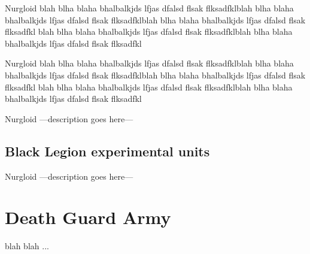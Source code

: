 \documentclass[a4paper, twocolumn]{article}
\begin{document}
\unit{Nurgloid} {							%
blah blha blaha bhalbalkjds lfjas dfalsd flsak flksadfklblah blha blaha bhalbalkjds lfjas dfalsd flsak flksadfklblah blha blaha bhalbalkjds lfjas dfalsd flsak flksadfkl
blah blha blaha bhalbalkjds lfjas dfalsd flsak flksadfklblah blha blaha bhalbalkjds lfjas dfalsd flsak flksadfkl
}
\statsEND		

\unit{Nurgloid} {							%
blah blha blaha bhalbalkjds lfjas dfalsd flsak flksadfklblah blha blaha bhalbalkjds lfjas dfalsd flsak flksadfklblah blha blaha bhalbalkjds lfjas dfalsd flsak flksadfkl
blah blha blaha bhalbalkjds lfjas dfalsd flsak flksadfklblah blha blaha bhalbalkjds lfjas dfalsd flsak flksadfkl
}
\statsEND		

\unit{Nurgloid} {							%
	---description goes here---
}
\statsEND		

\clearpage
\subsection{Black Legion experimental units}

\unit{Nurgloid} {							%
	---description goes here---
}
\statsEND									%

\twocolumn
%
\clearpage
\section{Death Guard Army}
blah blah ...
\end{document}
